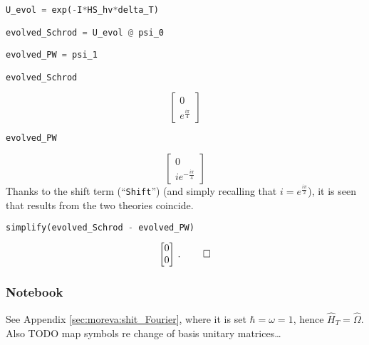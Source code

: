 \begin{lstlisting}[language=Python]
U_evol = exp(-I*HS_hv*delta_T)

evolved_Schrod = U_evol @ psi_0

evolved_PW = psi_1

evolved_Schrod
\end{lstlisting}
$$
  \left[\begin{matrix}0\\e^{\frac{i \pi}{4}}\end{matrix}\right]
$$
\begin{lstlisting}[language=Python]
evolved_PW
\end{lstlisting}
$$
  \left[\begin{matrix}0\\i e^{- \frac{i \pi}{4}}\end{matrix}\right]
$$
Thanks to the shift term (``\verb|Shift|'')
(and simply recalling that $i=e^{\frac{i\pi}{2}}$),
it is seen that
results from the two theories coincide.
\begin{lstlisting}[language=Python]
simplify(evolved_Schrod - evolved_PW)
\end{lstlisting}
$$
  \left[\begin{matrix}0\\0\end{matrix}\right] \, \text{.} \; \qed
$$

\subsubsection*{Notebook}

See Appendix \ref{sec:moreva:shit_Fourier}, where it is set $\hbar = \omega = 1$, hence $\hat{H}_T = \hat{\Omega}$.
Also TODO map symbols re change of basis unitary matrices\dots